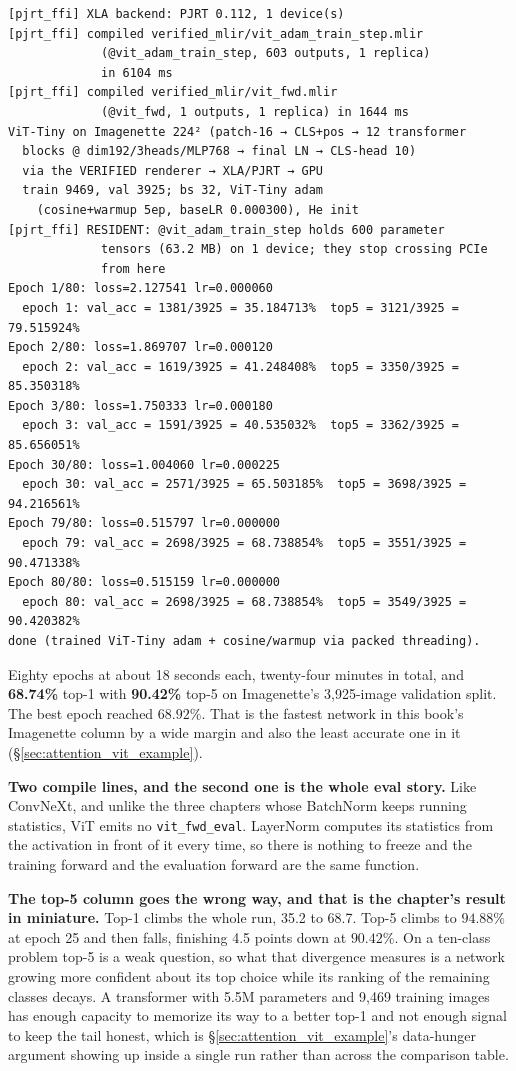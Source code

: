 \begin{verbatim}
[pjrt_ffi] XLA backend: PJRT 0.112, 1 device(s)
[pjrt_ffi] compiled verified_mlir/vit_adam_train_step.mlir
             (@vit_adam_train_step, 603 outputs, 1 replica)
             in 6104 ms
[pjrt_ffi] compiled verified_mlir/vit_fwd.mlir
             (@vit_fwd, 1 outputs, 1 replica) in 1644 ms
ViT-Tiny on Imagenette 224² (patch-16 → CLS+pos → 12 transformer
  blocks @ dim192/3heads/MLP768 → final LN → CLS-head 10)
  via the VERIFIED renderer → XLA/PJRT → GPU
  train 9469, val 3925; bs 32, ViT-Tiny adam
    (cosine+warmup 5ep, baseLR 0.000300), He init
[pjrt_ffi] RESIDENT: @vit_adam_train_step holds 600 parameter
             tensors (63.2 MB) on 1 device; they stop crossing PCIe
             from here
Epoch 1/80: loss=2.127541 lr=0.000060
  epoch 1: val_acc = 1381/3925 = 35.184713%  top5 = 3121/3925 = 79.515924%
Epoch 2/80: loss=1.869707 lr=0.000120
  epoch 2: val_acc = 1619/3925 = 41.248408%  top5 = 3350/3925 = 85.350318%
Epoch 3/80: loss=1.750333 lr=0.000180
  epoch 3: val_acc = 1591/3925 = 40.535032%  top5 = 3362/3925 = 85.656051%
Epoch 30/80: loss=1.004060 lr=0.000225
  epoch 30: val_acc = 2571/3925 = 65.503185%  top5 = 3698/3925 = 94.216561%
Epoch 79/80: loss=0.515797 lr=0.000000
  epoch 79: val_acc = 2698/3925 = 68.738854%  top5 = 3551/3925 = 90.471338%
Epoch 80/80: loss=0.515159 lr=0.000000
  epoch 80: val_acc = 2698/3925 = 68.738854%  top5 = 3549/3925 = 90.420382%
done (trained ViT-Tiny adam + cosine/warmup via packed threading).
\end{verbatim}

Eighty epochs at about 18 seconds each, twenty-four minutes in total,
and \textbf{68.74\%} top-1 with \textbf{90.42\%} top-5 on Imagenette's
3,925-image validation split. The best epoch reached $68.92\%$. That is
the fastest network in this book's Imagenette column by a wide margin
and also the least accurate one in it
(\S\ref{sec:attention_vit_example}).

\medskip\noindent\textbf{Two compile lines, and the second one is the
whole eval story.} Like ConvNeXt, and unlike the three chapters whose
BatchNorm keeps running statistics, ViT emits no \texttt{vit\_fwd\_eval}. LayerNorm computes its
statistics from the activation in front of it every time, so there is
nothing to freeze and the training forward and the evaluation forward
are the same function.

\medskip\noindent\textbf{The top-5 column goes the wrong way, and that
is the chapter's result in miniature.} Top-1 climbs the whole run, 35.2
to 68.7. Top-5 climbs to $94.88\%$ at epoch 25 and then falls,
finishing 4.5 points down at $90.42\%$. On a ten-class problem top-5 is
a weak question, so what that divergence measures is a network growing
more confident about its top choice while its ranking of the remaining
classes decays. A transformer with 5.5M parameters and 9,469 training
images has enough capacity to memorize its way to a better top-1 and
not enough signal to keep the tail honest, which is
\S\ref{sec:attention_vit_example}'s data-hunger argument showing up
inside a single run rather than across the comparison table.

